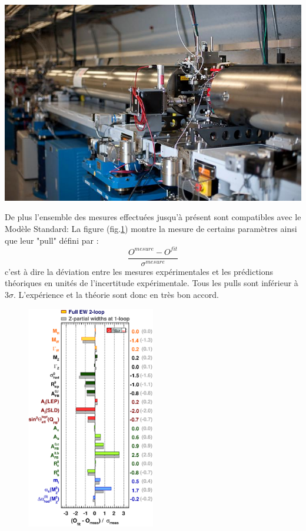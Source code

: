 \marginpar
{
	\centering
	\includegraphics[width=\marginparwidth]{SM/slac.jpg}
	\label{SLAC}
}

De plus l'ensemble des mesures effectuées jusqu'à présent sont compatibles avec le Modèle Standard: La figure (fig.\ref{mesures}) montre la mesure de certains paramètres ainsi que leur "pull" défini par :
\begin{equation}
\frac{O^{mesure}-O^{fit}}{\sigma^{mesure}}
\end{equation}
c'est à dire la déviation entre les mesures expérimentales et les prédictions théoriques en unités de l'incertitude expérimentale. Tous les pulls sont inférieur à $3\sigma$. L'expérience et la théorie sont donc en très bon accord.

\begin{figure}[h!]
\centering
\includegraphics[width=0.50\textwidth]{SM/mesure.eps}
\label{mesures}
\end{figure}

